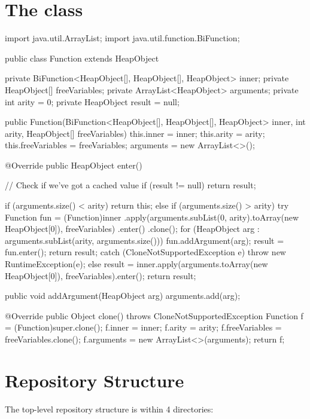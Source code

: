 \documentclass[dissertation.tex]{subfiles}
\begin{document}
\begin{appendices}
\chapter{The  class}\label{appendix:function}
{
    \begin{javafigure}
import java.util.ArrayList;
import java.util.function.BiFunction;

public class Function extends HeapObject {
    private BiFunction<HeapObject[], HeapObject[], HeapObject> inner;
    private HeapObject[] freeVariables;
    private ArrayList<HeapObject> arguments;
    private int arity = 0;
    private HeapObject result = null;

    public Function(BiFunction<HeapObject[], HeapObject[], HeapObject> inner, int arity, HeapObject[] freeVariables) {
        this.inner = inner;
        this.arity = arity;
        this.freeVariables = freeVariables;
        arguments = new ArrayList<>();
    }

    @Override
    public HeapObject enter() {
        // Check if we've got a cached value
        if (result != null) {
            return result;
        }

        if (arguments.size() < arity) {
            return this;
        }
        else if (arguments.size() > arity) {
            try {
                Function fun = (Function)inner
                    .apply(arguments.subList(0, arity).toArray(new HeapObject[0]), freeVariables)
                    .enter()
                    .clone();
                for (HeapObject arg : arguments.subList(arity, arguments.size()))
                    fun.addArgument(arg);
                result = fun.enter();
                return result;
            }
            catch (CloneNotSupportedException e) {
                throw new RuntimeException(e);
            }
        }
        else {
            result = inner.apply(arguments.toArray(new HeapObject[0]), freeVariables).enter();
            return result;
        }
    }

    public void addArgument(HeapObject arg) {
        arguments.add(arg);
    }

    @Override
    public Object clone() throws CloneNotSupportedException {
        Function f = (Function)super.clone();
        f.inner = inner;
        f.arity = arity;
        f.freeVariables = freeVariables.clone();
        f.arguments = new ArrayList<>(arguments);
        return f;
    }
}
    \end{javafigure}
}
\chapter{Repository Structure}\label{appendix:directory-structure}
{
    The top-level repository structure is within 4 directories:

}
\end{appendices}
\end{document}
